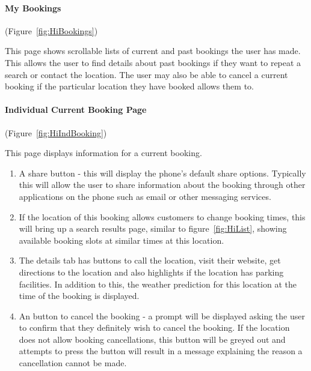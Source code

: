 \paragraph{My Bookings} (Figure~\ref{fig:HiBookings})


This page shows scrollable lists of current and past bookings the
user has made. This allows the user to find details about past bookings
if they want to repeat a search or contact the location. The user
may also be able to cancel a current booking if the particular location
they have booked allows them to.

\paragraph{Individual Current Booking Page} (Figure~\ref{fig:HiIndBooking})


This page displays information for a current booking.
\begin{enumerate}
	\item A share button - this will display the phone's default share options.
		  Typically this will allow the user to share information about the
		  booking through other applications on the phone such as email or other
		  messaging services.
	\item If the location of this booking allows customers to change booking
		  times, this will bring up a search results page, similar to figure~\ref{fig:HiList},
		  showing available booking slots at similar times at this location.
	\item The details tab has buttons to call the location, visit their website,
		  get directions to the location and also highlights if the location
		  has parking facilities. In addition to this, the weather prediction
		  for this location at the time of the booking is displayed.
	\item An button to cancel the booking - a prompt will be displayed asking
		  the user to confirm that they definitely wish to cancel the booking.
		  If the location does not allow booking cancellations, this button
		  will be greyed out and attempts to press the button will result in
		  a message explaining the reason a cancellation cannot be made.
\end{enumerate}

